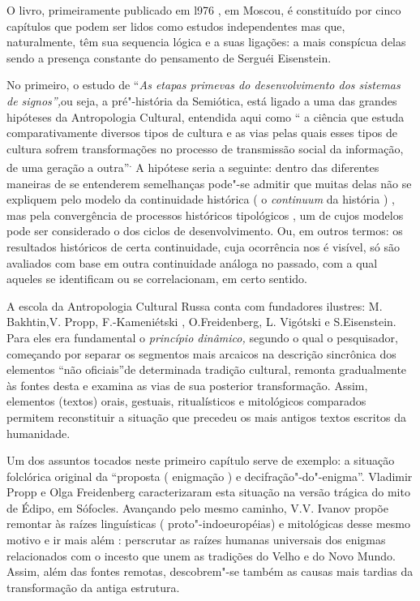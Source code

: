 O livro, primeiramente publicado em l976 , em Moscou, é constituído por
cinco capítulos que podem ser lidos como estudos independentes mas que,
naturalmente, têm sua sequencia lógica e a suas ligações: a mais
conspícua delas sendo a presença constante do pensamento de Serguéi
Eisenstein.

No primeiro, o estudo de ``\emph{As etapas primevas do desenvolvimento
dos sistemas de signos'',}ou seja, a pré"-história da Semiótica, está
ligado a uma das grandes hipóteses da Antropologia Cultural, entendida
aqui como `` a ciência que estuda comparativamente diversos tipos de
cultura e as vias pelas quais esses tipos de cultura sofrem
transformações no processo de transmissão social da informação, de uma
geração a outra''\textsuperscript{.} A hipótese seria a seguinte: dentro
das diferentes maneiras de se entenderem semelhanças pode"-se admitir que
muitas delas não se expliquem pelo modelo da continuidade histórica ( o
\emph{continuum} da história ) , mas pela convergência de processos
históricos tipológicos , um de cujos modelos pode ser considerado o dos
ciclos de desenvolvimento. Ou, em outros termos: os resultados
históricos de certa continuidade, cuja ocorrência nos é visível, só são
avaliados com base em outra continuidade análoga no passado, com a qual
aqueles se identificam ou se correlacionam, em certo sentido.

A escola da Antropologia Cultural Russa conta com fundadores ilustres:
M. Bakhtin,V. Propp, F.-Kameniétski , O.Freidenberg, L. Vigótski e
S.Eisenstein. Para eles era fundamental o \emph{princípio dinâmico,}
segundo o qual o pesquisador, começando por separar os segmentos mais
arcaicos na descrição sincrônica dos elementos ``não oficiais''de
determinada tradição cultural, remonta gradualmente às fontes desta e
examina as vias de sua posterior transformação. Assim, elementos
(textos) orais, gestuais, ritualísticos e mitológicos comparados
permitem reconstituir a situação que precedeu os mais antigos textos
escritos da humanidade.

Um dos assuntos tocados neste primeiro capítulo serve de exemplo: a
situação folclórica original da ``proposta ( enigmação ) e
decifração"-do"-enigma''. Vladimir Propp e Olga Freidenberg caracterizaram
esta situação na versão trágica do mito de Édipo, em Sófocles. Avançando
pelo mesmo caminho, V.V. Ivanov propõe remontar às raízes linguísticas (
proto"-indoeuropéias) e mitológicas desse mesmo motivo e ir mais além :
perscrutar as raízes humanas universais dos enigmas relacionados com o
incesto que unem as tradições do Velho e do Novo Mundo. Assim, além das
fontes remotas, descobrem"-se também as causas mais tardias da
transformação da antiga estrutura.

